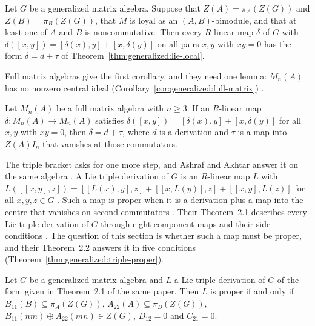 \begin{theorem}\label{thm:generalized:lie-loyal}
Let $G$ be a generalized matrix algebra. Suppose that $Z(A)=\pi_A(Z(G))$ and
$Z(B)=\pi_B(Z(G))$, that $M$ is loyal as an $(A,B)$-bimodule, and that at least
one of $A$ and $B$ is noncommutative. Then every $R$-linear map $\delta$ of $G$
with $\delta([x,y])=[\delta(x),y]+[x,\delta(y)]$ on all pairs $x,y$ with $xy=0$
has the form $\delta=d+\tau$ of Theorem~\ref{thm:generalized:lie-local}.
\end{theorem}

Full matrix algebras give the first corollary, and they need one lemma:
$M_n(A)$ has no nonzero central ideal
(Corollary~\ref{cor:generalized:full-matrix}) \cite[Lemma~1,
p.~2726]{DuWang2012}.

\begin{corollary}\label{cor:generalized:full-matrix}
Let $M_n(A)$ be a full matrix algebra with $n\ge 3$. If an $R$-linear map
$\delta\colon M_n(A)\to M_n(A)$ satisfies
$\delta([x,y])=[\delta(x),y]+[x,\delta(y)]$ for all $x,y$ with $xy=0$, then
$\delta=d+\tau$, where $d$ is a derivation and $\tau$ is a map into $Z(A)I_n$
that vanishes at those commutators.
\end{corollary}

The triple bracket asks for one more step, and Ashraf and Akhtar answer it on
the same algebra \cite[p.~3651]{AshrafAkhtar2020}. A Lie triple derivation of
$G$ is an $R$-linear map $L$ with
$L([[x,y],z])=[[L(x),y],z]+[[x,L(y)],z]+[[x,y],L(z)]$ for all $x,y,z\in G$
\cite[p.~3651]{AshrafAkhtar2020}. Such a map is proper when it is a derivation
plus a map into the centre that vanishes on second commutators
\cite[p.~3651]{AshrafAkhtar2020}. Their Theorem~2.1 describes every Lie triple
derivation of $G$ through eight component maps and their side conditions
\cite[Theorem~2.1, p.~3--3654]{AshrafAkhtar2020}. The question of this
section is whether such a map must be proper, and their Theorem~2.2 answers it
in five conditions \cite[Theorem~2.2, p.~7]{AshrafAkhtar2020}
(Theorem~\ref{thm:generalized:triple-proper}).

\begin{theorem}\label{thm:generalized:triple-proper}
Let $G$ be a generalized matrix algebra and $L$ a Lie triple derivation of $G$ of
the form given in Theorem~2.1 of the same paper. Then $L$ is proper if and only if
$B_{11}(B)\subseteq\pi_A(Z(G))$, $A_{22}(A)\subseteq\pi_B(Z(G))$,
$B_{11}(nm)\oplus A_{22}(mn)\in Z(G)$, $D_{12}=0$ and $C_{21}=0$.
\end{theorem}

